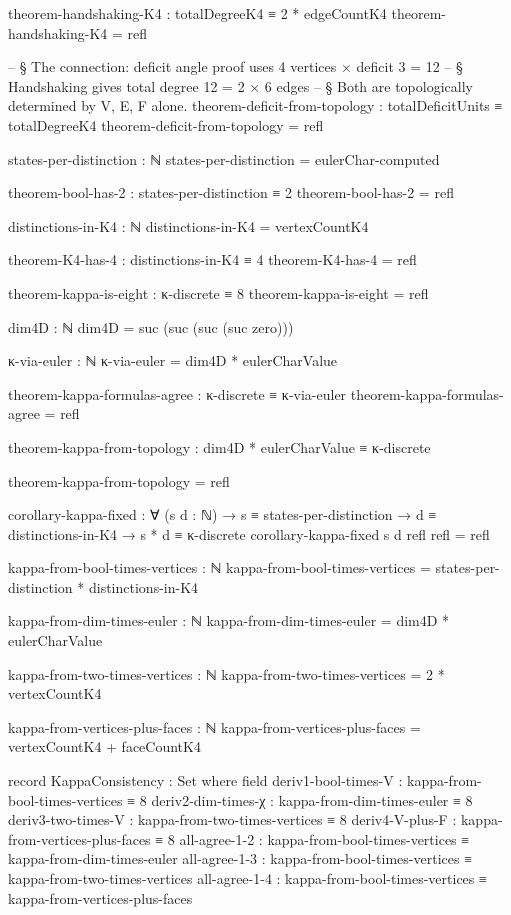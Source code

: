 \documentclass[11pt,a4paper]{book}
\begin{document}
\begin{code}
theorem-handshaking-K4 : totalDegreeK4 ≡ 2 * edgeCountK4
theorem-handshaking-K4 = refl

-- § The connection: deficit angle proof uses 4 vertices × deficit 3 = 12
-- § Handshaking gives total degree 12 = 2 × 6 edges
-- § Both are topologically determined by V, E, F alone.
theorem-deficit-from-topology : totalDeficitUnits ≡ totalDegreeK4
theorem-deficit-from-topology = refl

states-per-distinction : ℕ
states-per-distinction = eulerChar-computed

theorem-bool-has-2 : states-per-distinction ≡ 2
theorem-bool-has-2 = refl

distinctions-in-K4 : ℕ
distinctions-in-K4 = vertexCountK4

theorem-K4-has-4 : distinctions-in-K4 ≡ 4
theorem-K4-has-4 = refl

theorem-kappa-is-eight : κ-discrete ≡ 8
theorem-kappa-is-eight = refl

dim4D : ℕ  
dim4D = suc (suc (suc (suc zero)))

κ-via-euler : ℕ
κ-via-euler = dim4D * eulerCharValue

theorem-kappa-formulas-agree : κ-discrete ≡ κ-via-euler
theorem-kappa-formulas-agree = refl

theorem-kappa-from-topology : dim4D * eulerCharValue ≡ κ-discrete

theorem-kappa-from-topology = refl

corollary-kappa-fixed : ∀ (s d : ℕ) → 
  s ≡ states-per-distinction → d ≡ distinctions-in-K4 → s * d ≡ κ-discrete
corollary-kappa-fixed s d refl refl = refl

kappa-from-bool-times-vertices : ℕ
kappa-from-bool-times-vertices = states-per-distinction * distinctions-in-K4

kappa-from-dim-times-euler : ℕ
kappa-from-dim-times-euler = dim4D * eulerCharValue

kappa-from-two-times-vertices : ℕ
kappa-from-two-times-vertices = 2 * vertexCountK4

kappa-from-vertices-plus-faces : ℕ
kappa-from-vertices-plus-faces = vertexCountK4 + faceCountK4

record KappaConsistency : Set where
  field
    deriv1-bool-times-V  : kappa-from-bool-times-vertices ≡ 8
    deriv2-dim-times-χ   : kappa-from-dim-times-euler ≡ 8
    deriv3-two-times-V   : kappa-from-two-times-vertices ≡ 8
    deriv4-V-plus-F      : kappa-from-vertices-plus-faces ≡ 8
    all-agree-1-2        : kappa-from-bool-times-vertices ≡ kappa-from-dim-times-euler
    all-agree-1-3        : kappa-from-bool-times-vertices ≡ kappa-from-two-times-vertices
    all-agree-1-4        : kappa-from-bool-times-vertices ≡ kappa-from-vertices-plus-faces


\end{code}
\end{document}
